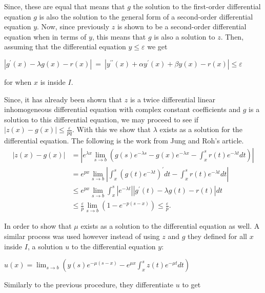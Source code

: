 \documentclass[mla9]{mla}
\begin{document}
\begin{paper}
Since, these are equal that means that $\mathit{g}$ the solution to the first-order differential equation $\mathit{g}$ is also the solution to the general form of a second-order differential equation $\mathit{y}$. Now, since previously $\mathit{z}$ is shown to be a second-order differential equation when in terms of $\mathit{y}$, this means that $\mathit{g}$ is also a solution to $\mathit{z}$. Then, assuming that the differential equation $\mathit{y} \leq \varepsilon$ we get
\begin{center}
    $|g^\prime (x)- \lambda g(x) - r(x)|\ =\ |y^{\prime \prime}(x)+\alpha y^{\prime}(x)+\beta y(x)-r(x)| \leq \varepsilon$
\end{center}
for when $x$ is inside $\mathit{I}$.

Since, it has already been shown that $\mathit{z}$ is a twice differential linear inhomogeneous differential equation with complex constant coefficients and $\mathit{g}$ is a solution to this differential equation, we may proceed to see if $|z(x) - g(x)| \leq \frac{\varepsilon}{p q}$. With this we show that $\lambda$ exists as a solution for the differential equation. The following is the work from Jung and Roh's article.
\[\begin{aligned}
    |z(x)-g(x)| & =\left|e^{\lambda x} \lim _{s \rightarrow b}\left(g(s) e^{-\lambda s}-g(x) e^{-\lambda x}-\int_x^s r(t) e^{-\lambda t} d t\right)\right| \\ & =e^{p x} \lim _{s \rightarrow b}\left|\int_x^s\left(g(t) e^{-\lambda t}\right)^{\prime} d t-\int_x^s r(t) e^{-\lambda t} d t\right| \\ & \leq e^{p x} \lim _{s \rightarrow b} \int_x^s\left|e^{-\lambda t}\right|\left|g^{\prime}(t)-\lambda g(t)-r(t)\right| d t \\ & \leq \frac{\varepsilon}{p} \lim _{s \rightarrow b}\left(1-e^{-p(s-x)}\right) \leq \frac{\varepsilon}{p} .
\end{aligned}\]

In order to show that $\mu$ exists as a solution to the differential equation as well. A similar process was used however instead of using $z$ and $g$ they defined for all $x$ inside $I$, a solution $u$ to the differential equation $y$:

\begin{center}
    $u(x)=\lim _{s \rightarrow b}\left(y(s) e^{-\mu(s-x)}-e^{\mu x} \int_x^s z(t) e^{-\mu t} d t\right)$
\end{center}
Similarly to the previous procedure, they differentiate $u$ to get


\end{paper}
\end{document}
